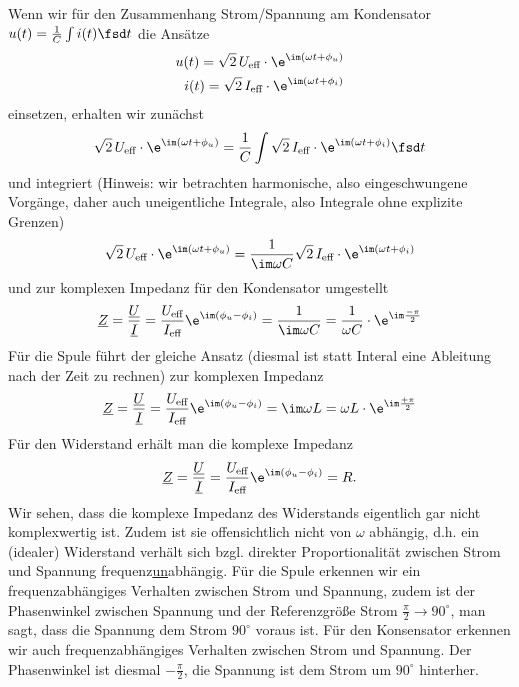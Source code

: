 Wenn wir für den Zusammenhang Strom/Spannung am Kondensator
$u(t) = \frac{1}{C} \int i(t) \fsd t$
die Ansätze
\begin{align}
u(t) = \sqrt{2} \, U_\text{eff} \cdot \e^{\im(\omega t + \phi_u)}\\
i(t) = \sqrt{2} \, I_\text{eff} \cdot \e^{\im(\omega t + \phi_i)}
\end{align}
einsetzen, erhalten wir zunächst
\begin{align}
\sqrt{2} \, U_\text{eff} \cdot \e^{\im(\omega t + \phi_u)} = \frac{1}{C} \int \sqrt{2} \, I_\text{eff} \cdot \e^{\im(\omega t + \phi_i)} \fsd t
\end{align}
und integriert (Hinweis: wir betrachten harmonische, also eingeschwungene Vorgänge, daher auch uneigentliche Integrale, also Integrale ohne explizite Grenzen)
\begin{align}
\sqrt{2} \, U_\text{eff} \cdot \e^{\im(\omega t + \phi_u)} = \frac{1}{\im \omega C} \sqrt{2} \, I_\text{eff} \cdot \e^{\im(\omega t + \phi_i)}
\end{align}
und zur komplexen Impedanz für den Kondensator umgestellt
\begin{align}
\label{eq:appb_ZC}
\underline{Z} = \frac{\underline{U}}{\underline{I}} = \frac{U_\text{eff}}{I_\text{eff}} \e^{\im (\phi_u-\phi_i)} = \frac{1}{\im \omega C} = \frac{1}{\omega C} \cdot \e^{\im \frac{-\pi}{2}}
\end{align}
%
Für die Spule führt der gleiche Ansatz (diesmal ist statt Interal eine Ableitung nach der Zeit zu rechnen)
zur komplexen Impedanz
\begin{align}
\underline{Z} = \frac{\underline{U}}{\underline{I}} = \frac{U_\text{eff}}{I_\text{eff}} \e^{\im (\phi_u-\phi_i)} = \im \omega L = \omega L \cdot \e^{\im \frac{+\pi}{2}}
\end{align}
%
Für den Widerstand erhält man die komplexe Impedanz
\begin{align}
\underline{Z} = \frac{\underline{U}}{\underline{I}} = \frac{U_\text{eff}}{I_\text{eff}} \e^{\im (\phi_u-\phi_i)} = R.
\end{align}
%
Wir sehen, dass die komplexe Impedanz des Widerstands eigentlich gar nicht komplexwertig ist.
Zudem ist sie offensichtlich nicht von $\omega$ abhängig, d.h. ein (idealer) Widerstand
verhält sich bzgl. direkter Proportionalität zwischen Strom und Spannung frequenz\underline{un}abhängig.
%
Für die Spule erkennen wir ein frequenzabhängiges Verhalten zwischen Strom und Spannung, zudem
ist der Phasenwinkel zwischen Spannung und der Referenzgröße Strom $\frac{\pi}{2} \rightarrow 90^\circ$, man sagt,
dass die Spannung dem Strom $90^\circ$ voraus ist.
%
Für den Konsensator erkennen wir auch frequenzabhängiges Verhalten zwischen Strom und Spannung.
Der Phasenwinkel ist diesmal $-\frac{\pi}{2}$, die Spannung ist dem Strom um $90^\circ$ hinterher.



